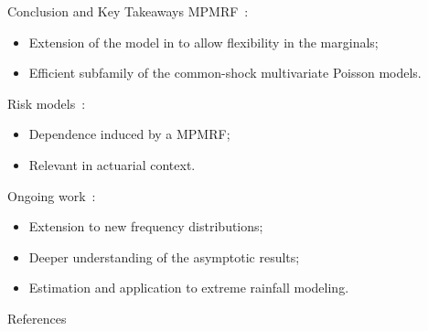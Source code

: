 \documentclass[11pt,xcolor={dvipsnames},hyperref={pdftex,pdfpagemode=UseNone,hidelinks,pdfdisplaydoctitle=true},usepdftitle=false]{beamer}
\begin{document}
\begin{frame}{Conclusion and Key Takeaways}
MPMRF~:
\begin{itemize}
    \item Extension of the model in \cite{cote2025tree} to allow flexibility in the marginals;
    \item Efficient subfamily of the common-shock multivariate Poisson models.
\end{itemize}
Risk models~:
\begin{itemize}
    \item Dependence induced by a MPMRF;
    \item Relevant in actuarial context. 
\end{itemize}
Ongoing work~:
\begin{itemize}
    \item Extension to new frequency distributions;
    \item Deeper understanding of the asymptotic results;
    \item Estimation and application to extreme rainfall modeling.
\end{itemize}
\end{frame}
\appendix

\begin{frame}[allowframebreaks]{References}


\end{frame}
\end{document}
